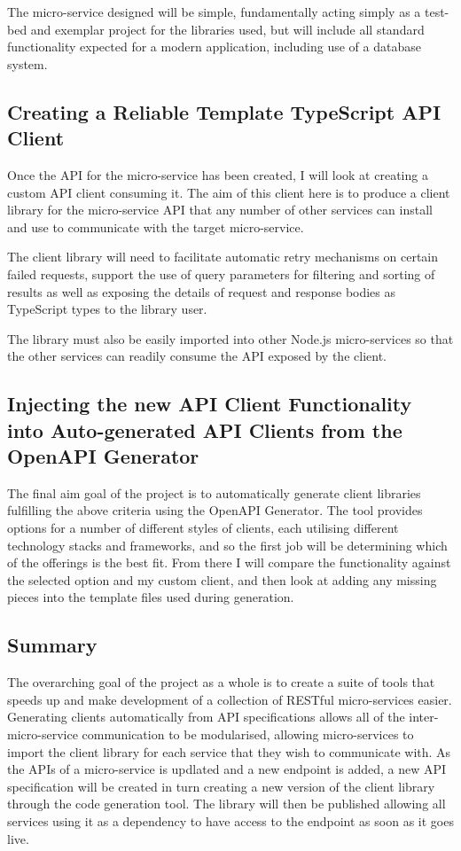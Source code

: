 The micro-service designed will be simple, fundamentally acting simply as a test-bed and exemplar project for the libraries used, but will include all standard functionality expected for a modern application, including use of a database system.

\subsection{Creating a Reliable Template TypeScript API Client }
Once the API for the micro-service has been created, I will look at creating a custom API client consuming it. The aim of this client here is to produce a client library for the micro-service API that any number of other services can install and use to communicate with the target micro-service.

The client library will need to facilitate automatic retry mechanisms on certain failed requests, support the use of query parameters for filtering and sorting of results as well as exposing the details of request and response bodies as TypeScript types to the library user.

The library must also be easily imported into other Node.js micro-services so that the other services can readily consume the API exposed by the client.

\subsection{Injecting the new API Client Functionality into Auto-generated API Clients from the OpenAPI Generator}
The final aim goal of the project is to automatically generate client libraries fulfilling the above criteria using the OpenAPI Generator. The tool provides options for a number of different styles of clients, each utilising different technology stacks and frameworks, and so the first job will be determining which of the offerings is the best fit. From there I will compare the functionality against the selected option and my custom client, and then look at adding any missing pieces into the template files used during generation.

\subsection{Summary}
The overarching goal of the project as a whole is to create a suite of tools that speeds up and make development of a collection of RESTful micro-services easier. Generating clients automatically from API specifications allows all of the inter-micro-service communication to be modularised, allowing micro-services to import the client library for each service that they wish to communicate with. As the APIs of a micro-service is updlated and a new endpoint is added, a new API specification will be created in turn creating a new version of the client library through the code generation tool. The library will then be published allowing all services using it as a dependency to have access to the endpoint as soon as it goes live.

